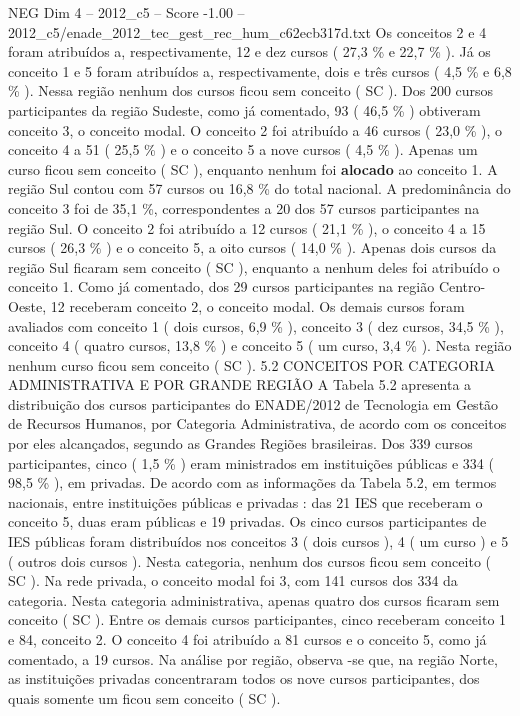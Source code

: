 \begin{textsample}{NEG Dim 4 – 2012\_c5 – Score -1.00 – 2012\_c5/enade\_2012\_tec\_gest\_rec\_hum\_c62ecb317d.txt}
Os conceitos 2 e 4 foram atribuídos a, respectivamente, 12 e dez cursos ( 27,3 \% e 22,7 \% ).
Já os conceito 1 e 5 foram atribuídos a, respectivamente, dois e três cursos ( 4,5 \% e 6,8 \% ).
Nessa região nenhum dos cursos ficou sem conceito ( SC ).
Dos 200 cursos participantes da região Sudeste, como já comentado, 93 ( 46,5 \% ) obtiveram conceito 3, o conceito modal.
O conceito 2 foi atribuído a 46 cursos ( 23,0 \% ), o conceito 4 a 51 ( 25,5 \% ) e o conceito 5 a nove cursos ( 4,5 \% ).
Apenas um curso ficou sem conceito ( SC ), enquanto nenhum foi \textbf{alocado} ao conceito 1.
A região Sul contou com 57 cursos ou 16,8 \% do total nacional.
A predominância do conceito 3 foi de 35,1 \%, correspondentes a 20 dos 57 cursos participantes na região Sul.
O conceito 2 foi atribuído a 12 cursos ( 21,1 \% ), o conceito 4 a 15 cursos ( 26,3 \% ) e o conceito 5, a oito cursos ( 14,0 \% ).
Apenas dois cursos da região Sul ficaram sem conceito ( SC ), enquanto a nenhum deles foi atribuído o conceito 1.
Como já comentado, dos 29 cursos participantes na região Centro-Oeste, 12 receberam conceito 2, o conceito modal.
Os demais cursos foram avaliados com conceito 1 ( dois cursos, 6,9 \% ), conceito 3 ( dez cursos, 34,5 \% ), conceito 4 ( quatro cursos, 13,8 \% ) e conceito 5 ( um curso, 3,4 \% ).
Nesta região nenhum curso ficou sem conceito ( SC ). 5.2 CONCEITOS POR CATEGORIA ADMINISTRATIVA E POR GRANDE REGIÃO A Tabela 5.2 apresenta a distribuição dos cursos participantes do ENADE/2012 de Tecnologia em Gestão de Recursos Humanos, por Categoria Administrativa, de acordo com os conceitos por eles alcançados, segundo as Grandes Regiões brasileiras.
Dos 339 cursos participantes, cinco ( 1,5 \% ) eram ministrados em instituições públicas e 334 ( 98,5 \% ), em privadas.
De acordo com as informações da Tabela 5.2, em termos nacionais, entre instituições públicas e privadas : das 21 IES que receberam o conceito 5, duas eram públicas e 19 privadas.
Os cinco cursos participantes de IES públicas foram distribuídos nos conceitos 3 ( dois cursos ), 4 ( um curso ) e 5 ( outros dois cursos ).
Nesta categoria, nenhum dos cursos ficou sem conceito ( SC ).
Na rede privada, o conceito modal foi 3, com 141 cursos dos 334 da categoria.
Nesta categoria administrativa, apenas quatro dos cursos ficaram sem conceito ( SC ).
Entre os demais cursos participantes, cinco receberam conceito 1 e 84, conceito 2.
O conceito 4 foi atribuído a 81 cursos e o conceito 5, como já comentado, a 19 cursos.
Na análise por região, observa -se que, na região Norte, as instituições privadas concentraram todos os nove cursos participantes, dos quais somente um ficou sem conceito ( SC ).

\end{textsample}
